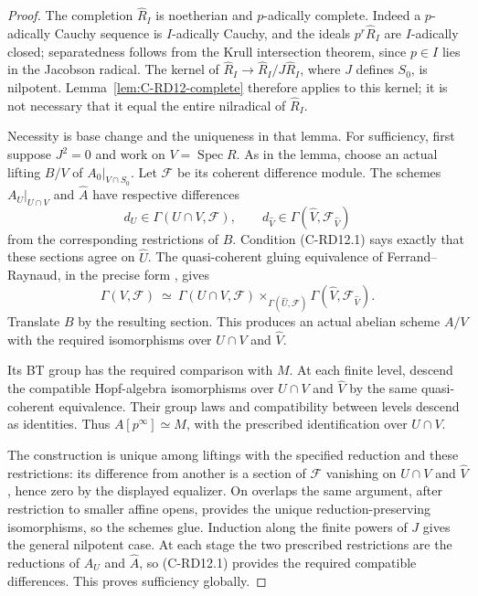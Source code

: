 \begin{proof}
The completion $\widehat R_I$ is noetherian and $p$-adically complete.
Indeed a $p$-adically Cauchy sequence is $I$-adically Cauchy, and the
ideals $p^r\widehat R_I$ are $I$-adically closed; separatedness follows
from the Krull intersection theorem, since $p\in I$ lies in the
Jacobson radical. The kernel of
$\widehat R_I\to\widehat R_I/J\widehat R_I$, where $J$ defines
$S_0$, is nilpotent. Lemma~\ref{lem:C-RD12-complete} therefore applies
to this kernel; it is not necessary that it equal the entire
nilradical of $\widehat R_I$.

Necessity is base change and the uniqueness in that lemma. For
sufficiency, first suppose $J^2=0$ and work on $V=\operatorname{Spec}R$.
As in the lemma, choose an actual lifting $B/V$ of $A_0|_{V\cap S_0}$.
Let $\mathcal F$ be its coherent difference module. The schemes
$A_U|_{U\cap V}$ and $\widehat A$ have respective differences
\[
 d_U\in\Gamma(U\cap V,\mathcal F),\qquad
 d_{\widehat V}\in\Gamma(\widehat V,\mathcal F_{\widehat V})
\]
from the corresponding restrictions of $B$. Condition (C-RD12.1)
says exactly that these sections agree on $\widehat U$.
The quasi-coherent gluing equivalence of Ferrand--Raynaud, in the
precise form \cite[Theorem~0.3, p.561]{MoretBailly1996Descent}, gives
\[
 \Gamma(V,\mathcal F)\ \simeq\
 \Gamma(U\cap V,\mathcal F)
 \mathop{\times}_{\Gamma(\widehat U,\mathcal F)}
 \Gamma(\widehat V,\mathcal F_{\widehat V}).
\]
Translate $B$ by the resulting section. This produces an actual
abelian scheme $A/V$ with the required isomorphisms over $U\cap V$
and $\widehat V$.

Its BT group has the required comparison with $M$. At each finite
level, descend the compatible Hopf-algebra isomorphisms over
$U\cap V$ and $\widehat V$ by the same quasi-coherent equivalence.
Their group laws and compatibility between levels descend as
identities. Thus $A[p^\infty]\simeq M$, with the prescribed
identification over $U\cap V$.

The construction is unique among liftings with the specified
reduction and these restrictions: its difference from another is a
section of $\mathcal F$ vanishing on $U\cap V$ and $\widehat V$,
hence zero by the displayed equalizer. On overlaps the same argument,
after restriction to smaller affine opens, provides the unique
reduction-preserving isomorphisms, so the schemes glue. Induction
along the finite powers of $J$ gives the general nilpotent case.
At each stage the two prescribed restrictions are the reductions of
$A_U$ and $\widehat A$, so (C-RD12.1) provides the required compatible
differences. This proves sufficiency globally.
\end{proof}

